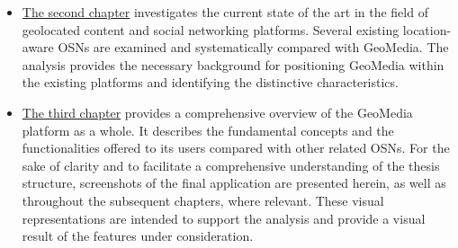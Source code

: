\begin{itemize}
    \item {\hyperref[cap:relatedwork]{The second chapter}} investigates the current state of the art in the field of geolocated content and social networking platforms. Several existing location-aware OSNs are examined and systematically compared with GeoMedia. The analysis provides the necessary background for positioning GeoMedia within the existing platforms and identifying the distinctive characteristics.
    \item {\hyperref[cap:geomedia]{The third chapter}} provides a comprehensive overview of the GeoMedia platform as a whole. It describes the fundamental concepts and the functionalities offered to its users compared with other related OSNs. For the sake of clarity and to facilitate a comprehensive understanding of the thesis structure, screenshots of the final application are presented herein, as well as throughout the subsequent chapters, where relevant. These visual representations are intended to support the analysis and provide a visual result of the features under consideration.


\end{itemize}
